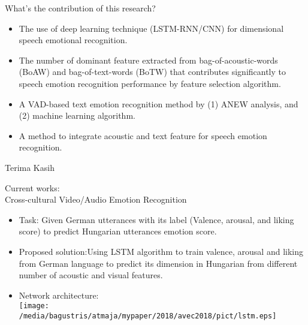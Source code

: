 \documentclass{beamer}
\begin{document}
\begin{frame}[t, fragile]{What's the contribution of this research?}
\begin{itemize}
	\item The use of deep learning technique (LSTM-RNN/CNN) for dimensional 
	      speech emotional recognition.
	\item The number of dominant feature extracted from bag-of-acoustic-words
	      (BoAW) and bag-of-text-words (BoTW) that contributes significantly to 
	      speech emotion recognition
	      performance by feature selection algorithm.
	\item A VAD-based text emotion recognition method by (1) ANEW analysis,  and (2) 
	      machine learning algorithm. 
	\item A method to integrate acoustic and text feature for speech emotion 
	      recognition.
\end{itemize}
\end{frame}

\begin{frame}[t, fragile]
\vspace{60pt}
\begin{center}
\LARGE{Terima Kasih}
\end{center}
\end{frame}

\begin{frame}[t, fragile]{Current works: \\ Cross-cultural Video/Audio 
Emotion Recognition}
\begin{itemize}
\item Task: Given German utterances with its label (Valence, arousal, and liking score) 
            to predict Hungarian utterances emotion score.
\item Proposed solution:Using LSTM algorithm to train valence, arousal and liking 
      from German language to predict its dimension in Hungarian from different 
      number of acoustic and visual features.
\item Network architecture:\\
\texttt{[image: /media/bagustris/atmaja/mypaper/2018/avec2018/pict/lstm.eps]}
\end{itemize}
\end{frame}
\end{document}
